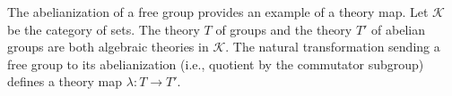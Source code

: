 The abelianization of a free group provides an example of a theory map. Let $\mathcal{K}$ be the category of sets. The theory $T$ of groups and the theory $T'$ of abelian groups are both algebraic theories in $\mathcal{K}$. The natural transformation sending a free group to its abelianization (i.e., quotient by the commutator subgroup) defines a theory map $\lambda: T \longrightarrow T'$.
